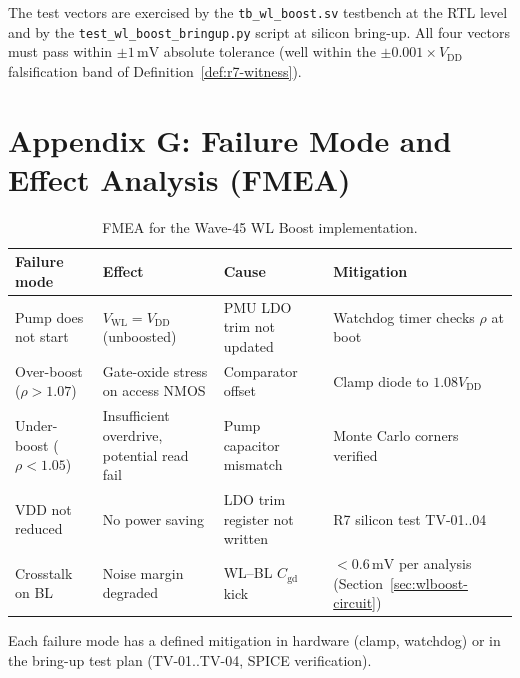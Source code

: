 The test vectors are exercised by the \texttt{tb\_wl\_boost.sv}
testbench at the RTL level and by the \texttt{test\_wl\_boost\_bringup.py}
script at silicon bring-up.  All four vectors must pass within $\pm 1\,\text{mV}$
absolute tolerance (well within the $\pm 0.001 \times V_{\mathrm{DD}}$
falsification band of Definition~\ref{def:r7-witness}).

\section*{Appendix G: Failure Mode and Effect Analysis (FMEA)}
\label{sec:wlboost-appendix-fmea}

\begin{table}[htbp]
  \centering
  \caption{FMEA for the Wave-45 WL Boost implementation.}
  \label{tab:fmea}
  \begin{tabular}{p{3cm}p{3cm}p{3cm}p{3cm}}
    \hline
    \textbf{Failure mode} & \textbf{Effect} & \textbf{Cause}
      & \textbf{Mitigation} \\
    \hline
    Pump does not start & $V_{\mathrm{WL}} = V_{\mathrm{DD}}$
      (unboosted) & PMU LDO trim not updated
      & Watchdog timer checks $\rho$ at boot \\
    Over-boost ($\rho > 1.07$) & Gate-oxide stress on access NMOS
      & Comparator offset & Clamp diode to $1.08 V_{\mathrm{DD}}$ \\
    Under-boost ($\rho < 1.05$) & Insufficient overdrive, potential read fail
      & Pump capacitor mismatch & Monte Carlo corners verified \\
    VDD not reduced & No power saving & LDO trim register not written
      & R7 silicon test TV-01..04 \\
    Crosstalk on BL & Noise margin degraded & WL–BL $C_{\mathrm{gd}}$ kick
      & $< 0.6\,\text{mV}$ per analysis (Section~\ref{sec:wlboost-circuit}) \\
    \hline
  \end{tabular}
\end{table}

Each failure mode has a defined mitigation in hardware (clamp, watchdog)
or in the bring-up test plan (TV-01..TV-04, SPICE verification).

